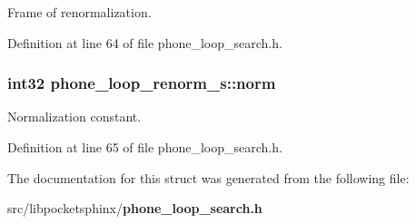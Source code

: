 Frame of renormalization. 



Definition at line 64 of file phone\-\_\-loop\-\_\-search.\-h.

\subsubsection[{norm}]{\setlength{\rightskip}{0pt plus 5cm}int32 phone\-\_\-loop\-\_\-renorm\-\_\-s\-::norm}\label{structphone__loop__renorm__s_a9a76415892efce2e4b53bc5ea6599010}


Normalization constant. 



Definition at line 65 of file phone\-\_\-loop\-\_\-search.\-h.



The documentation for this struct was generated from the following file\-:\begin{DoxyCompactItemize}
\item 
src/libpocketsphinx/{\bf phone\-\_\-loop\-\_\-search.\-h}\end{DoxyCompactItemize}
